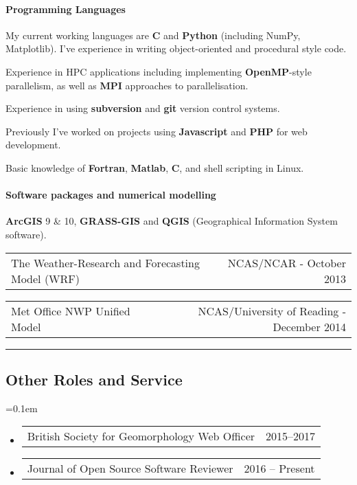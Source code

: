 \documentclass[10.5pt,a4]{article}
\makeatletter
\newcommand{\headerrow}[2]
{\begin{tabular*}{\linewidth}{l@{\extracolsep{\fill}}r}
	#1 &
	#2 \\
\end{tabular*}}
\newcommand{\CPP}
{C\nolinebreak[4]\hspace{-.05em}\raisebox{.22ex}{\footnotesize\bf ++}}
\makeatother
\begin{document}
	\paragraph*{Programming Languages}
		\begin{itemize*}
		\item My current working languages are {\textbf{\CPP}} and \textbf{Python} (including NumPy, Matplotlib). I've experience in writing object-oriented and procedural style code. 
		\item Experience in HPC applications including implementing \textbf{OpenMP}-style parallelism, as well as \textbf{MPI} approaches to parallelisation. 
		\item Experience in using \textbf{subversion} and \textbf{git} version control systems. 
		\item Previously I've worked on projects using \textbf{Javascript} and \textbf{PHP} for web development. 
		\item Basic knowledge of \textbf{Fortran}, \textbf{Matlab}, \textbf{C}, and shell scripting in Linux. 
		\end{itemize*}

\paragraph*{Software packages and numerical modelling}
	\begin{itemize*}
	\item  \textbf{ArcGIS} 9 \& 10, \textbf{GRASS-GIS} and \textbf{QGIS} (Geographical Information System software). 
	\item 
		\headerrow
		{The Weather-Research and Forecasting Model (WRF)} 
		{NCAS/NCAR - October 2013}
		\item 
		\headerrow
		{Met Office NWP Unified Model}
		{NCAS/University of Reading - December 2014}
	\end{itemize*}

\hrule
\vspace{-0.4em}
\subsection*{Other Roles and Service} 
	\parskip=0.1em
\begin{itemize}

	\item 
	\headerrow 
	  {British Society for Geomorphology Web Officer}
	  {2015--2017}

	\item
	\headerrow
		 {Journal of Open Source Software Reviewer}
		 {2016 -- Present}



\end{itemize}
\end{document}
